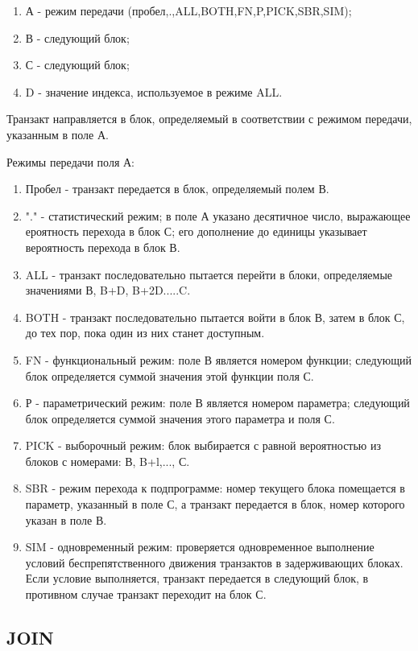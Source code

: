 \documentclass[14pt]{extarticle}
\begin{document}
\begin{enumerate}
	\item А - режим передачи (пробел,.,ALL,BOTH,FN,P,PICK,SBR,SIM); 
	\item В - следующий блок; 
	\item С - следующий блок; 
	\item D - значение индекса, используемое в режиме ALL. 
\end{enumerate}

Транзакт направляется в блок, определяемый в соответствии с режимом передачи, указанным в поле А.

Режимы передачи поля А: 

\begin{enumerate}
	\item Пробел - транзакт передается в блок, определяемый полем В. 
	\item "." - статистический режим; в поле А указано десятичное число, выражающее ероятность перехода в блок С; его дополнение до единицы указывает вероятность перехода в блок В.
	\item ALL - транзакт последовательно пытается перейти в блоки, определяемые значениями В, B+D, B+2D.....C.
	\item BOTH - транзакт последовательно пытается войти в блок В, затем в блок С, до тех пор, пока один из них станет доступным. 
	\item FN - функциональный режим: поле В является номером функции; следующий блок определяется суммой значения этой функции поля С. 
	\item Р - параметрический режим: поле В является номером параметра; следующий блок определяется суммой значения этого параметра и поля С. 
	\item PICK - выборочный режим: блок выбирается с равной вероятностью из блоков с номерами: В, B+l,..., С. 
	\item SBR - режим перехода к подпрограмме: номер текущего блока помещается в параметр, указанный в поле С, а транзакт передается в блок, номер которого указан в поле В. 
	\item SIM - одновременный режим: проверяется одновременное выполнение условий беспрепятственного движения транзактов в задерживающих блоках. Если условие выполняется, транзакт передается в следующий блок, в противном случае транзакт переходит на блок С. 
\end{enumerate}

\subsection*{JOIN}
\end{document}
